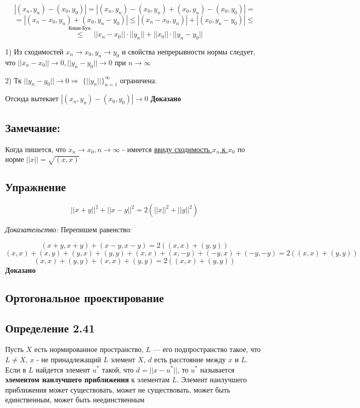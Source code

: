 \documentclass[12pt]{article}
\begin{document}
	$$|(x_n,y_n) - (x_0, y_0)| = |(x_n,y_n) - (x_0, y_n) + (x_0, y_n) - (x_0, y_0)| = $$
	$$ = |(x_n - x_0, y_n) + (x_0, y_n - y_0)| \leq |(x_n - x_0, y_n)| + |(x_0, y_n - y_0)| \leq$$
	$$\stackrel{\text{Коши-Бун.}}{\leq} ||x_n - x_0|| \cdot ||y_n|| + ||x_0||\cdot ||y_n - y_0||$$

1) Из сходимостей $x_n \to x_0, y_n \to y_0$ и свойства непрерывности нормы следует, что $||x_n - x_0|| \to 0, ||y_n - y_0|| \to 0$ при $n \to \infty$

2) Тк $||y_n - y_0|| \to 0 \Rightarrow$ 
 $\{ ||y_n|| \}_{n = 1}^{\infty}$ ограничена.
 
Отсюда вытекает $|(x_n,y_n) - (x_0, y_0)| \to 0$ \textbf{Доказано}

\subsection{Замечание:}
	Когда пишется, что $x_n \to x_0, n \to \infty$ - имеется \hyperref[eq103]{ввиду сходимость $x_n$ к $x_0$} по норме
		$||x|| = \sqrt{(x,x)} $

\subsection*{Упражнение}
		
	$$||x+y||^2 + ||x-y||^2 = 2(||x||^2 + ||y||^2)$$
	
\textit{Доказательство:} Перепишем равенство:
		
	$$(x+y , x+y) + (x-y , x-y) = 2((x,x) + (y,y))$$
	$$(x,x) + (x,y) + (y,x) + (y,y) + (x,x) + (x,-y) + (-y,x) + (-y,-y) = 2((x,x) + (y,y))$$
	$$(x,x) + (y,y) + (x,x) + (y,y) = 2((x,x) + (y,y))$$
	 \textbf{Доказано}
	

\newpage

\subsection{Ортогональное проектирование}	

\subsection*{Определение 2.41}
	Пусть $X$ есть нормированное пространство, $L$ — его подпространство такое, что $L \neq X$, $x$ - не принадлежащий $L$ элемент $X$, $d$ есть расстояние
между $x$ и $L$. Если в $L$ найдется элемент $u^*$ такой, что $d = ||x-u^*||$,
то $u^*$ называется \textbf{элементом наилучшего приближения} к элементам $L$. Элемент наилучшего приближения может существовать, может
не существовать, может быть единственным, может быть неединственным	
\end{document}
